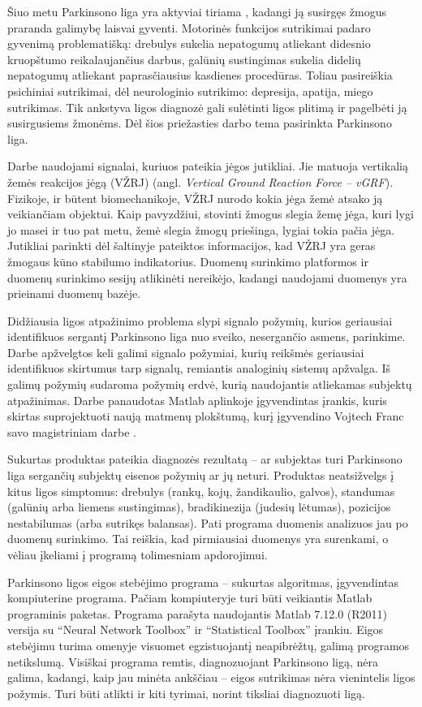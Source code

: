 \documentclass[]{vgtuef}
\begin{document}
Šiuo metu Parkinsono liga yra aktyviai tiriama \cite{vgtu}, kadangi ją susirgęs žmogus praranda galimybę laisvai gyventi. Motorinės funkcijos sutrikimai padaro gyvenimą problematišką: drebulys sukelia nepatogumų atliekant didesnio kruopštumo reikalaujančius darbus, galūnių sustingimas sukelia didelių nepatogumų atliekant paprasčiausius kasdienes procedūras. Toliau pasireiškia psichiniai sutrikimai, dėl neurologinio sutrikimo: depresija, apatija, miego sutrikimas. Tik ankstyva ligos diagnozė gali sulėtinti ligos plitimą ir pagelbėti ją susirgusiems žmonėms. Dėl šios priežasties darbo tema pasirinkta Parkinsono liga.

Darbe naudojami signalai, kuriuos pateikia jėgos jutikliai. Jie matuoja vertikalią žemės reakcijos jėgą (VŽRJ) (angl. \textit{Vertical Ground Reaction Force -- vGRF}). Fizikoje, ir būtent biomechanikoje, VŽRJ nurodo kokia jėga žemė atsako ją veikiančiam objektui. Kaip pavyzdžiui, stovinti žmogus slegia žemę jėga, kuri lygi jo masei ir tuo pat metu, žemė slegia žmogų priešinga, lygiai tokia pačia jėga. Jutikliai parinkti dėl šaltinyje \cite{S0966-6362(05)00058-5} pateiktos informacijos, kad VŽRJ yra geras žmogaus kūno stabilumo indikatorius. Duomenų surinkimo platformos ir duomenų surinkimo sesijų atlikinėti nereikėjo, kadangi naudojami duomenys yra prieinami duomenų bazėje.

Didžiausia ligos atpažinimo problema slypi signalo požymių, kurios geriausiai identifikuos sergantį Parkinsono liga nuo sveiko, nesergančio asmens, parinkime. Darbe apžvelgtos keli galimi signalo požymiai, kurių reikšmės geriausiai identifikuos skirtumus tarp signalų, remiantis analoginių sistemų apžvalga. Iš galimų požymių sudaroma požymių erdvė, kurią naudojantis atliekamas subjektų atpažinimas. Darbe panaudotas Matlab aplinkoje įgyvendintas įrankis, kuris skirtas suprojektuoti naują matmenų plokštumą, kurį įgyvendino Vojtech Franc savo magistriniam darbe \cite{stprtool}. 

Sukurtas produktas pateikia diagnozės rezultatą -- ar subjektas turi Parkinsono liga sergančių subjektų eisenos požymių ar jų neturi. Produktas neatsižvelgs į kitus ligos simptomus: drebulys (rankų, kojų, žandikaulio, galvos), standumas (galūnių arba liemens sustingimas), bradikinezija (judesių lėtumas), pozicijos nestabilumas (arba sutrikęs balansas). Pati programa duomenis analizuos jau po duomenų surinkimo. Tai reiškia, kad pirmiausiai duomenys yra surenkami, o vėliau įkeliami į programą tolimesniam apdorojimui.

Parkinsono ligos eigos stebėjimo programa -- sukurtas algoritmas, įgyvendintas kompiuterine programa. Pačiam kompiuteryje turi būti veikiantis Matlab programinis paketas. Programa parašyta naudojantis Matlab 7.12.0 (R2011) versija su ``Neural Network Toolbox'' ir ``Statistical Toolbox'' įrankiu. Eigos stebėjimu turima omenyje visuomet egzistuojantį neapibrėžtų, galimą programos netikslumą. Visiškai programa remtis, diagnozuojant Parkinsono ligą, nėra galima, kadangi, kaip jau minėta ankščiau -- eigos sutrikimas nėra vienintelis ligos požymis. Turi būti atlikti ir kiti tyrimai, norint tiksliai diagnozuoti ligą.
\end{document}
